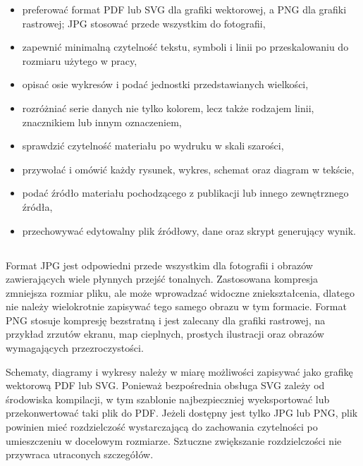\begin{itemize}
  \item preferować format PDF lub SVG dla grafiki wektorowej, a PNG dla grafiki rastrowej; JPG stosować przede wszystkim do fotografii,
  \item zapewnić minimalną czytelność tekstu, symboli i linii po przeskalowaniu do rozmiaru użytego w pracy,
  \item opisać osie wykresów i podać jednostki przedstawianych wielkości,
  \item rozróżniać serie danych nie tylko kolorem, lecz także rodzajem linii, znacznikiem lub innym oznaczeniem,
  \item sprawdzić czytelność materiału po wydruku w skali szarości,
  \item przywołać i omówić każdy rysunek, wykres, schemat oraz diagram w tekście,
  \item podać źródło materiału pochodzącego z publikacji lub innego zewnętrznego źródła,
  \item przechowywać edytowalny plik źródłowy, dane oraz skrypt generujący wynik.
\end{itemize}

\subsection{}

Format JPG jest odpowiedni przede wszystkim dla fotografii i obrazów zawierających wiele płynnych przejść tonalnych. Zastosowana kompresja zmniejsza rozmiar pliku, ale może wprowadzać widoczne zniekształcenia, dlatego nie należy wielokrotnie zapisywać tego samego obrazu w tym formacie. Format PNG stosuje kompresję bezstratną i jest zalecany dla grafiki rastrowej, na przykład zrzutów ekranu, map cieplnych, prostych ilustracji oraz obrazów wymagających przezroczystości.

Schematy, diagramy i wykresy należy w miarę możliwości zapisywać jako grafikę wektorową PDF lub SVG. Ponieważ bezpośrednia obsługa SVG zależy od środowiska kompilacji, w tym szablonie najbezpieczniej wyeksportować lub przekonwertować taki plik do PDF. Jeżeli dostępny jest tylko JPG lub PNG, plik powinien mieć rozdzielczość wystarczającą do zachowania czytelności po umieszczeniu w docelowym rozmiarze. Sztuczne zwiększanie rozdzielczości nie przywraca utraconych szczegółów.

\subsection{}

